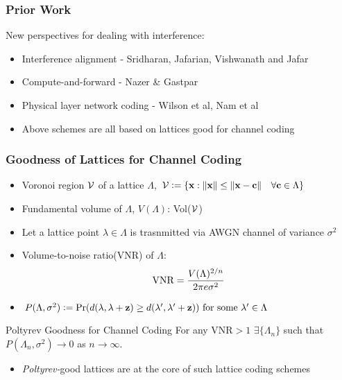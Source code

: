 \documentclass[10pt,presentation]{beamer}
\begin{document}
\begin{frame}\frametitle{Prior Work}
New perspectives for dealing with interference:
      \begin{itemize}
     		\item<1-> Interference alignment - Sridharan, Jafarian, Vishwanath and Jafar
			\item<2-> Compute-and-forward - Nazer \& Gastpar
			\item<2-> Physical layer network coding - Wilson et al, Nam et al
      \end{itemize}
			\vspace{2.5em}
			
	\begin{figure}
		\centering
	\end{figure}
\begin{itemize}
	\item Above schemes are all based on lattices {\blue good} for channel coding
\end{itemize}
\end{frame}

\begin{frame}\frametitle{Goodness of Lattices for Channel Coding}
\begin{itemize}
\item Voronoi region $\mathcal{V}$ of a lattice $\Lambda$, $\mathcal{V}\mathrel{\mathop:}= \{\mathbf{x}:\lVert{\mathbf{x}}\rVert\leq \lVert{\mathbf{x-c}}\rVert \quad\forall \mathbf{c}\in\Lambda\}$
\item Fundamental volume of $\Lambda$, $V(\Lambda)$: Vol($\mathcal{V}$)
\item Let a lattice point $\lambda\in\Lambda$ is trasnmitted via AWGN channel of variance $\sigma^2$
\item Volume-to-noise ratio(VNR) of $\Lambda$:
\begin{align*}
\text{VNR}=\frac{V(\Lambda)^{2/n}}{2\pi e\sigma^2}
\end{align*}
\item $P(\Lambda,\sigma^2)\mathrel{\mathop:}= \text{Pr}(d(\lambda,\lambda+\mathbf{z})\geq d(\lambda',\lambda'+\mathbf{z})) \text{ for some } \mathbf{\lambda'}\in\Lambda\ $
\end{itemize}
\begin{block}{Poltyrev Goodness for Channel Coding}
For any VNR$>1$ $\exists \{\Lambda_n\}$ such that $P(\Lambda_n,\sigma^2)\rightarrow 0$ as $n\rightarrow \infty$.
\end{block}
\begin{itemize}
	\item	{\blue \textit{Poltyrev-}good} lattices are at the core of such lattice coding schemes
\end{itemize}
\end{frame}  
\end{document}
